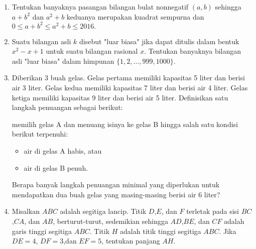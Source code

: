 \documentclass{article}
\begin{document}
\begin{enumerate}[resume]
		\item Tentukan banyaknya pasangan bilangan bulat nonnegatif $(a,b)$ sehingga $a+b^2$ dan $a^2+b$ keduanya merupakan kuadrat sempurna dan $0 \le a+b^2 \le a^2+b \le 2016.$
		
		\item Suatu bilangan asli $k$ disebut "luar biasa" jika dapat ditulis dalam bentuk $x^2-x+1$ untuk suatu bilangan rasional $x$. Tentukan banyaknya bilangan asli "luar biasa" dalam himpunan $\{1,2,\dots,999,1000\}$.
		
		\item Diberikan 3 buah gelas. Gelas pertama memiliki kapasitas 5 liter dan berisi air 3 liter. Gelas kedua memiliki kapasitas 7 liter dan berisi air 4 liter. Gelas ketiga memiliki kapasitas 9 liter dan berisi air 5 liter. Definisikan satu langkah penuangan sebagai berikut: 
		
		memilih gelas A dan menuang isinya ke gelas B hingga salah satu kondisi berikut terpenuhi:
		\begin{itemize}
			\item air di gelas A habis, atau
			\item air di gelas B penuh.
		\end{itemize}
	Berapa banyak langkah penuangan minimal yang diperlukan untuk mendapatkan dua buah gelas yang masing-masing berisi air 6 liter?
	
	\item Misalkan $ABC$ adalah segitiga lancip. Titik $D$,$E$, dan $F$ terletak pada sisi $BC$,$CA$, dan $AB$, berturut-turut, sedemikian sehingga $AD$,$BE$, dan $CF$ adalah garis tinggi segitiga $ABC$. Titik $H$ adalah titik tinggi segitiga $ABC$. Jika $DE=4$, $DF=3$,dan $EF=5$, tentukan panjang $AH$.
\end{enumerate}
\end{document}
